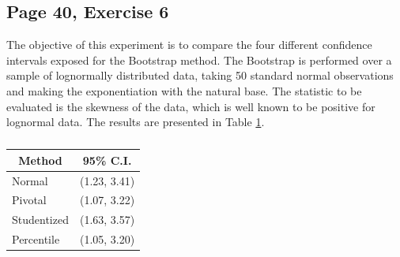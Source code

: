 \documentclass[11pt]{article}
\theoremstyle{definition}
\theoremstyle{remark}
\theoremstyle{remark}
\begin{document}
\subsection{Page 40, Exercise 6}
The objective of this experiment is to compare the four different
confidence intervals exposed for the Bootstrap method. The Bootstrap
is performed over a sample of lognormally distributed data, taking 50
standard normal observations and making the exponentiation with the
natural base. The statistic to be evaluated is the skewness of the
data, which is well known to be positive for lognormal data. The
results are presented in Table \ref{tab:cis}.
\begin{table}[H]
  \centering
\begin{tabular}{ll}
  \hline
  \multicolumn{1}{c}{\textbf{Method}} & \multicolumn{1}{c}{\textbf{95\% C.I.}} \\ \hline
  Normal                              & (1.23, 3.41)                           \\
  Pivotal                             & (1.07, 3.22)                           \\
  Studentized                         & (1.63, 3.57)                           \\
  Percentile                          & (1.05, 3.20)                           \\ \hline
\end{tabular}
\caption{}
\label{tab:cis}
\end{table}
\end{document}
